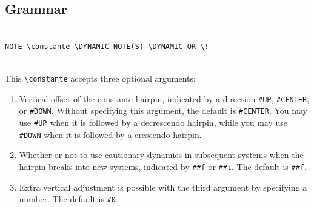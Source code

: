 \subsection{Grammar}
\begin{verbatim}

NOTE \constante \DYNAMIC NOTE(S) \DYNAMIC OR \!
 
\end{verbatim}

This \verb|\constante| accepts three optional arguments:
\begin{enumerate}
\item Vertical offset of the constante hairpin, indicated by a direction \verb|#UP|, \verb|#CENTER|, or \verb|#DOWN|. Without specifying this argument, the default is \verb|#CENTER|. You may use \verb|#UP| when it is followed by a decrescendo hairpin, while you may use \verb|#DOWN| when it is followed by a crescendo hairpin. 
\item Whether or not to use cautionary dynamics in subsequent systems when the hairpin breaks into new systems, indicated by \verb|##f| or \verb|##t|. The default is \verb|##f|.
\item Extra vertical adjustment is possible with the third argument by specifying a number. The default is \verb|#0|. 
\end{enumerate}



